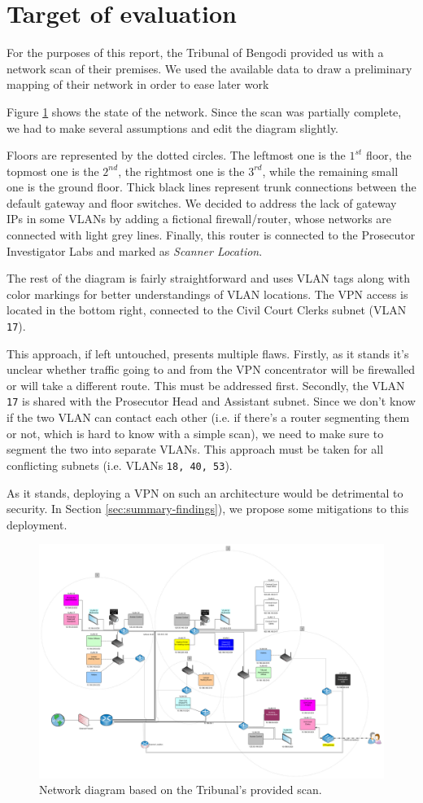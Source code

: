 \section{Target of evaluation}
\label{sec:target-evaluation}

For the purposes of this report, the Tribunal of Bengodi provided us with a network scan of their premises. We used the available data to draw a preliminary mapping of their network in order to ease later work

Figure \ref{fig:initial-network} shows the state of the network. Since the scan was partially complete, we had to make several assumptions and edit the diagram slightly.

Floors are represented by the dotted circles. The leftmost one is the $1^{st}$ floor, the topmost one is the $2^{nd}$, the rightmost one is the $3^{rd}$, while the remaining small one is the ground floor. Thick black lines represent trunk connections between the default gateway and floor switches. We decided to address the lack of gateway IPs in some VLANs by adding a fictional firewall/router, whose networks are connected with light grey lines. Finally, this router is connected to the Prosecutor Investigator Labs and marked as \textit{Scanner Location}.

The rest of the diagram is fairly straightforward and uses VLAN tags along with color markings for better understandings of VLAN locations. The VPN access is located in the bottom right, connected to the Civil Court Clerks subnet (VLAN \verb=17=).

This approach, if left untouched, presents multiple flaws. Firstly, as it stands it's unclear whether traffic going to and from the VPN concentrator will be firewalled or will take a different route. This must be addressed first. Secondly, the VLAN \verb=17= is shared with the Prosecutor Head and Assistant subnet. Since we don't know if the two VLAN can contact each other (i.e. if there's a router segmenting them or not, which is hard to know with a simple scan), we need to make sure to segment the two into separate VLANs. This approach must be taken for all conflicting subnets (i.e. VLANs \verb=18, 40, 53=).

As it stands, deploying a VPN on such an architecture would be detrimental to security. In Section \ref{sec:summary-findings}), we propose some mitigations to this deployment.

\begin{figure}[!h]
	\centering
	\includegraphics[width=\textwidth]{drawable/rete.png}
	\caption{Network diagram based on the Tribunal's provided scan.}
	\label{fig:initial-network}
\end{figure}

\clearpage